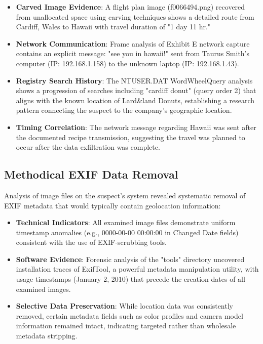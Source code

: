 \begin{itemize}
    \item \textbf{Carved Image Evidence}: A flight plan image (f0066494.png) recovered from unallocated space using carving techniques shows a detailed route from Cardiff, Wales to Hawaii with travel duration of "1 day 11 hr."
    
    \item \textbf{Network Communication}: Frame analysis of Exhibit E network capture contains an explicit message: "see you in hawaii!" sent from Taurus Smith's computer (IP: 192.168.1.158) to the unknown laptop (IP: 192.168.1.43).
    
    \item \textbf{Registry Search History}: The NTUSER.DAT WordWheelQuery analysis shows a progression of searches including "cardiff donut" (query order 2) that aligns with the known location of Lard\&land Donuts, establishing a research pattern connecting the suspect to the company's geographic location.
    
    \item \textbf{Timing Correlation}: The network message regarding Hawaii was sent after the documented recipe transmission, suggesting the travel was planned to occur after the data exfiltration was complete.
\end{itemize}

\subsection{Methodical EXIF Data Removal}
Analysis of image files on the suspect's system revealed systematic removal of EXIF metadata that would typically contain geolocation information:

\begin{itemize}
    \item \textbf{Technical Indicators}: All examined image files demonstrate uniform timestamp anomalies (e.g., 0000-00-00 00:00:00 in Changed Date fields) consistent with the use of EXIF-scrubbing tools.
    
    \item \textbf{Software Evidence}: Forensic analysis of the "tools" directory uncovered installation traces of ExifTool, a powerful metadata manipulation utility, with usage timestamps (January 2, 2010) that precede the creation dates of all examined images.
    
    \item \textbf{Selective Data Preservation}: While location data was consistently removed, certain metadata fields such as color profiles and camera model information remained intact, indicating targeted rather than wholesale metadata stripping.
\end{itemize}

